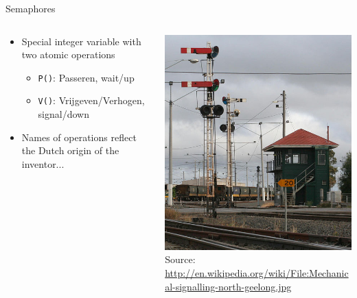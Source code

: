 \begin{frame}{Semaphores}
  \begin{columns}[c]
    \begin{column}{0.50\textwidth}
      \begin{itemize}
      \item Special integer variable with two atomic operations
        \begin{itemize}
        \item \lstinline!P()!: Passeren, wait/up
        \item \lstinline!V()!: Vrijgeven/Verhogen, signal/down
        \end{itemize}
      \item Names of operations reflect the Dutch origin of the
        inventor...
      \end{itemize}
    \end{column}
    \begin{column}{0.50\textwidth}
      \begin{center}
        \includegraphics[width=\textwidth]{figures/semaphores} \\
        \tiny{Source: \url{http://en.wikipedia.org/wiki/File:Mechanical-signalling-north-geelong.jpg}}
      \end{center}
    \end{column}
  \end{columns}
\end{frame}


